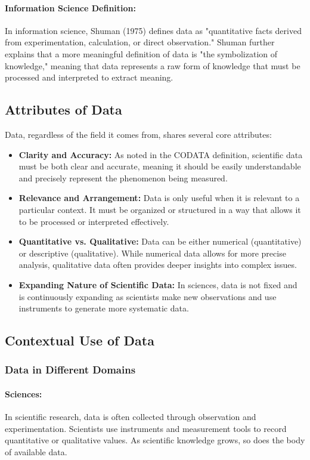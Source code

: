 \documentclass[12pt, oneside]{book}
\begin{document}
\paragraph{Information Science Definition:}
In information science, Shuman (1975) defines data as "quantitative facts derived from experimentation, calculation, or direct observation." Shuman further explains that a more meaningful definition of data is "the symbolization of knowledge," meaning that data represents a raw form of knowledge that must be processed and interpreted to extract meaning.\\
\subsection{Attributes of Data}
Data, regardless of the field it comes from, shares several core attributes:
\begin{itemize}
	\item \textbf{Clarity and Accuracy:} As noted in the CODATA definition, scientific data must be both clear and accurate, meaning it should be easily understandable and precisely represent the phenomenon being measured.
	\item \textbf{Relevance and Arrangement:} Data is only useful when it is relevant to a particular context. It must be organized or structured in a way that allows it to be processed or interpreted effectively.\\
	\item \textbf{Quantitative vs. Qualitative:} Data can be either numerical (quantitative) or descriptive (qualitative). While numerical data allows for more precise analysis, qualitative data often provides deeper insights into complex issues.\\
	\item \textbf{Expanding Nature of Scientific Data:} In sciences, data is not fixed and is continuously expanding as scientists make new observations and use instruments to generate more systematic data.
\end{itemize}
\subsection{Contextual Use of Data}
\subsubsection{Data in Different Domains}
\paragraph{Sciences:} In scientific research, data is often collected through observation and experimentation. Scientists use instruments and measurement tools to record quantitative or qualitative values. As scientific knowledge grows, so does the body of available data.\\
\end{document}
